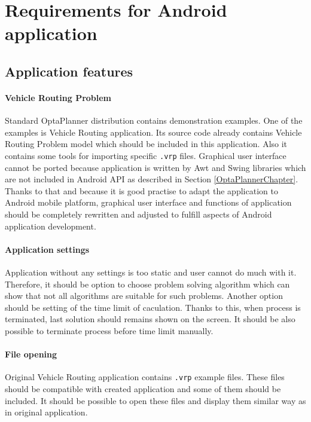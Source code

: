 \section{Requirements for Android application}

\subsection{Application features}\label{FeaturesSection}

\paragraph{Vehicle Routing Problem}
Standard OptaPlanner distribution \cite{OptaPlannerDistribution} contains demonstration examples. One of the examples is
Vehicle Routing application. Its source code already contains Vehicle Routing Problem model which should be included in
this application. Also it contains some tools for importing specific \texttt{.vrp} files. Graphical user interface
cannot be ported because application is written by Awt and Swing libraries which are not included in Android API as
described in Section \ref{OptaPlannerChapter}. Thanks to that and because it is good practise to adapt the application
to Android mobile platform, graphical user interface and functions of application should be completely rewritten and
adjusted to fulfill aspects of Android application development.

\paragraph{Application settings}
Application without any settings is too static and user cannot do much with it. Therefore, it should be option to choose
problem solving algorithm which can show that not all algorithms are suitable for such problems. Another option should
be setting of the time limit of caculation. Thanks to this, when process is terminated, last solution should remains
shown on the screen. It should be also possible to terminate process before time limit manually.

\paragraph{File opening}
Original Vehicle Routing application contains \texttt{.vrp} example files. These files should be compatible with created
application and some of them should be included. It should be possible to open these files and display them similar way
as in original application.

